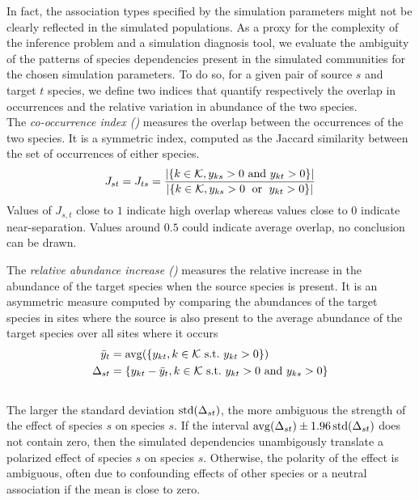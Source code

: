 \documentclass[10pt,a4paper]{article}
\begin{document}
In fact, the association types specified by the simulation parameters might not be clearly reflected in the simulated populations. As a proxy for the complexity of the inference problem and a simulation diagnosis tool, we evaluate the ambiguity of the patterns of species dependencies present in the simulated communities for the chosen simulation parameters. To do so, for a given pair of source $s$ and target $t$ species, we define two indices that quantify respectively the overlap in occurrences and the relative variation in abundance of the two species.\\  

The \emph{co-occurrence index (\evJoc)} measures the overlap between the occurrences of the two species.  It is a symmetric index, computed as the Jaccard similarity between the set of occurrences of either species.
\begin{equation*}
J_{st} = J_{ts} = \dfrac{\left\lvert\{k \in \mathcal{K},  y_{k s} > 0 \text{ and } y_{k t} > 0\}\right\rvert}{\left\lvert\{k \in \mathcal{K},  y_{k s} > 0 \text{ \;or\; } y_{k t} > 0\}\right\rvert}
\end{equation*}
Values of $J_{s,t}$ close to $1$ indicate high overlap whereas values close to $0$ indicate near-separation. Values around $0.5$ could indicate average overlap, no conclusion can be drawn. \\


The \emph{relative abundance increase (\evRAI)} measures the relative increase in the abundance of the target species when the source species is present. It is an asymmetric measure computed by comparing the abundances of the target species in sites where the source is also present to the average abundance of the target species over all sites where it occurs
\begin{align*}
  \bar{y}_{t} & = \operatorname{avg}(\{ y_{k t},  k \in \mathcal{K}\text{ s.t.\ }y_{k t} > 0\}) \\
  \Delta_{st} & = \{ y_{k t} - \bar{y}_{t},  k \in \mathcal{K}\text{ s.t.\ }y_{k t} > 0 \text{ and } y_{k s} > 0\}
\end{align*} \\

The larger the standard deviation $\operatorname{std}(\Delta_{st})$, the more ambiguous the strength of the effect of species $s$ on species $s$. If the interval $\operatorname{avg}(\Delta_{st}) \pm 1.96 \operatorname{std}(\Delta_{st})$ does not contain zero, then the simulated dependencies unambigously translate a polarized effect of species $s$ on species $s$. Otherwise, the polarity of the effect is ambiguous, often due to confounding effects of other species or a neutral association if the mean is close to zero.\\
\end{document}
